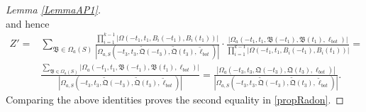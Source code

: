 \begin{proof}[Lemma \ref{LemmaAP1}]
\[	\]
	and hence
	\begin{equation*}
		\begin{split}
			Z' =&\sum_{\mathfrak{B}\in \Omega_a(S)}\frac{\prod_{i = 1}^{k-1}|\Omega(-t_1,t_1,B_i(-t_1),B_i(t_1))|}{|\Omega_{a,S}(-t_3,t_3,\tilde{\mathfrak{Q}}(-t_3),\tilde{\mathfrak{Q}}(t_3),\tilde\ell_{bot})|}\cdot\frac{|\Omega_a(-t_1,t_1,\mathfrak B(-t_1),\mathfrak{B}(t_1),\ell_{bot})|}{\prod_{i = 1}^{k-1}|\Omega(-t_1,t_1, B_i(-t_1),B_i(t_1))|}=\\ 
			&\frac{\sum_{\mathfrak{B}\in\Omega_a(S)}|\Omega_a(-t_1,t_1,\mathfrak B(-t_1),\mathfrak B(t_1),\ell_{bot})|}{|\Omega_{a,S}(-t_3,t_3,\tilde{\mathfrak{Q}}(-t_3),\tilde{\mathfrak{Q}}(t_3),\tilde{\ell}_{bot})|} = \frac{|\Omega_a(-t_3,t_3,{\mathfrak{Q}}(-t_3),{\mathfrak{Q}}(t_3),\ell_{bot})|}{|\Omega_{a,S}(-t_3,t_3,\tilde{\mathfrak{Q}}(-t_3),\tilde{\mathfrak{Q}}(t_3),\tilde{\ell}_{bot})|}.
		\end{split}
	\end{equation*}
	Comparing the above identities proves the second equality in \eqref{propRadon}.
	

\end{proof}
